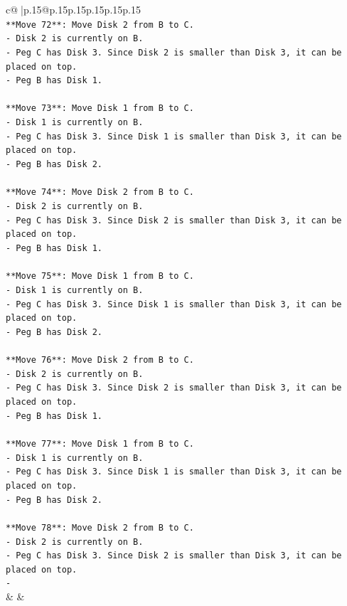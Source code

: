 \documentclass{article}
\begin{document}
{\begin{supertabular}{c@{$\;$}|p{.15\linewidth}@{}p{.15\linewidth}p{.15\linewidth}p{.15\linewidth}p{.15\linewidth}p{.15\linewidth}}
{{{\\ 
\texttt{**Move 72**: Move Disk 2 from B to C.} \\
\texttt{{-} Disk 2 is currently on B.} \\
\texttt{{-} Peg C has Disk 3. Since Disk 2 is smaller than Disk 3, it can be placed on top.} \\
\texttt{{-} Peg B has Disk 1.} \\
\\ 
\texttt{**Move 73**: Move Disk 1 from B to C.} \\
\texttt{{-} Disk 1 is currently on B.} \\
\texttt{{-} Peg C has Disk 3. Since Disk 1 is smaller than Disk 3, it can be placed on top.} \\
\texttt{{-} Peg B has Disk 2.} \\
\\ 
\texttt{**Move 74**: Move Disk 2 from B to C.} \\
\texttt{{-} Disk 2 is currently on B.} \\
\texttt{{-} Peg C has Disk 3. Since Disk 2 is smaller than Disk 3, it can be placed on top.} \\
\texttt{{-} Peg B has Disk 1.} \\
\\ 
\texttt{**Move 75**: Move Disk 1 from B to C.} \\
\texttt{{-} Disk 1 is currently on B.} \\
\texttt{{-} Peg C has Disk 3. Since Disk 1 is smaller than Disk 3, it can be placed on top.} \\
\texttt{{-} Peg B has Disk 2.} \\
\\ 
\texttt{**Move 76**: Move Disk 2 from B to C.} \\
\texttt{{-} Disk 2 is currently on B.} \\
\texttt{{-} Peg C has Disk 3. Since Disk 2 is smaller than Disk 3, it can be placed on top.} \\
\texttt{{-} Peg B has Disk 1.} \\
\\ 
\texttt{**Move 77**: Move Disk 1 from B to C.} \\
\texttt{{-} Disk 1 is currently on B.} \\
\texttt{{-} Peg C has Disk 3. Since Disk 1 is smaller than Disk 3, it can be placed on top.} \\
\texttt{{-} Peg B has Disk 2.} \\
\\ 
\texttt{**Move 78**: Move Disk 2 from B to C.} \\
\texttt{{-} Disk 2 is currently on B.} \\
\texttt{{-} Peg C has Disk 3. Since Disk 2 is smaller than Disk 3, it can be placed on top.} \\
\texttt{{-}} \\
            }
        }
    }
    & & \\ \\


\end{supertabular}}
\end{document}
